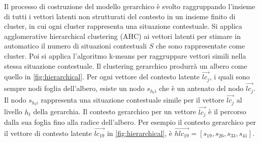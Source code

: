 Il processo di costruzione del modello gerarchico è svolto raggruppando l'insieme di tutti i vettori latenti non strutturati del contesto in un insieme finito di cluster, in cui ogni cluster rappresenta una situazione contestuale. Si applica agglomerative hierarchical clustering (AHC) \cite{AHC} ai vettori latenti per stimare in automatico il numero di situazioni contestuali $S$ che sono rappresentate come cluster. Poi si applica l'algoritmo k-means  per raggruppare vettori simili nella stessa situazione contestuale. Il clustering gerarchico produrrà un albero come quello in \autoref{fig:hierarchical}. Per ogni vettore del contesto latente $\overrightarrow{lc_j}$, i quali sono sempre nodi foglia dell'albero, esiste un nodo $s_{h_ti}$ che è un antenato del nodo $\overrightarrow{lc_j}$. Il nodo $s_{h_ti}$ rappresenta una situazione contestuale simile per il vettore $\overrightarrow{lc_j}$ al livello $h_t$ della gerarchia. Il contesto gerarchico per un vettore $\overrightarrow{lc_j}$ è il percorso dalla sua foglia fino alla radice dell'albero. Per esempio il contesto gerarchico per il vettore di contesto latente $\overrightarrow{lc_{19}}$ in \autoref{fig:hierarchical}, è $\overrightarrow{hlc_{19}} = [s_{19}, s_{26}, s_{33}, s_{41}]$.

